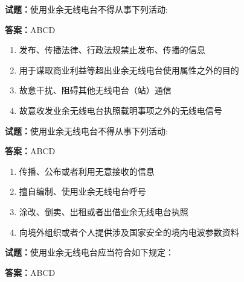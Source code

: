 \documentclass{ctexbook}
\begin{document}




\vspace{1em}

\textbf{试题：}使用业余无线电台不得从事下列活动: 

\textbf{答案：}ABCD 

\begin{enumerate}[leftmargin=3em]
  \item 发布、传播法律、行政法规禁止发布、传播的信息 

  \item 用于谋取商业利益等超出业余无线电台使用属性之外的目的 

  \item 故意干扰、阻碍其他无线电台（站）通信 

  \item 故意收发业余无线电台执照载明事项之外的无线电信号 

\end{enumerate}





\vspace{1em}

\textbf{试题：}使用业余无线电台不得从事下列活动: 

\textbf{答案：}ABCD 

\begin{enumerate}[leftmargin=3em]
  \item 传播、公布或者利用无意接收的信息 

  \item 擅自编制、使用业余无线电台呼号 

  \item 涂改、倒卖、出租或者出借业余无线电台执照 

  \item 向境外组织或者个人提供涉及国家安全的境内电波参数资料 

\end{enumerate}





\vspace{1em}

\textbf{试题：}使用业余无线电台应当符合如下规定： 

\textbf{答案：}ABCD 
\end{document}
